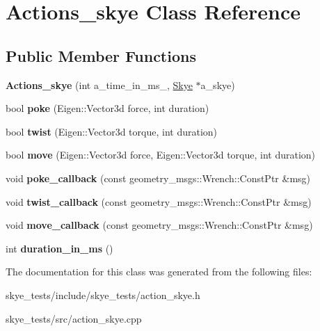 \hypertarget{class_actions__skye}{\section{Actions\-\_\-skye Class Reference}
\label{class_actions__skye}
}
\subsection*{Public Member Functions}
\begin{DoxyCompactItemize}
\item 
\hypertarget{class_actions__skye_aa039f0081ea0593477b08731d92bee1e}{{\bfseries Actions\-\_\-skye} (int a\-\_\-time\-\_\-in\-\_\-ms\-\_\-, \hyperlink{class_skye}{Skye} $\ast$a\-\_\-skye)}\label{class_actions__skye_aa039f0081ea0593477b08731d92bee1e}

\item 
\hypertarget{class_actions__skye_af5867f71704e52693007db4ab1845d24}{bool {\bfseries poke} (Eigen\-::\-Vector3d force, int duration)}\label{class_actions__skye_af5867f71704e52693007db4ab1845d24}

\item 
\hypertarget{class_actions__skye_a5aa98248ae4390991838fb5f40241033}{bool {\bfseries twist} (Eigen\-::\-Vector3d torque, int duration)}\label{class_actions__skye_a5aa98248ae4390991838fb5f40241033}

\item 
\hypertarget{class_actions__skye_a3b07fc6001859d70c766b7f0caa067ac}{bool {\bfseries move} (Eigen\-::\-Vector3d force, Eigen\-::\-Vector3d torque, int duration)}\label{class_actions__skye_a3b07fc6001859d70c766b7f0caa067ac}

\item 
\hypertarget{class_actions__skye_a8534c3ed16d40bda704a0ad9ab02036f}{void {\bfseries poke\-\_\-callback} (const geometry\-\_\-msgs\-::\-Wrench\-::\-Const\-Ptr \&msg)}\label{class_actions__skye_a8534c3ed16d40bda704a0ad9ab02036f}

\item 
\hypertarget{class_actions__skye_a66eb2349625a38723b253a84b6bd2c65}{void {\bfseries twist\-\_\-callback} (const geometry\-\_\-msgs\-::\-Wrench\-::\-Const\-Ptr \&msg)}\label{class_actions__skye_a66eb2349625a38723b253a84b6bd2c65}

\item 
\hypertarget{class_actions__skye_ac33f385c3ab1a4c3cabd2f56fc762429}{void {\bfseries move\-\_\-callback} (const geometry\-\_\-msgs\-::\-Wrench\-::\-Const\-Ptr \&msg)}\label{class_actions__skye_ac33f385c3ab1a4c3cabd2f56fc762429}

\item 
\hypertarget{class_actions__skye_a2dc9bd96450fb48addcbe14dd6b3f99e}{int {\bfseries duration\-\_\-in\-\_\-ms} ()}\label{class_actions__skye_a2dc9bd96450fb48addcbe14dd6b3f99e}

\end{DoxyCompactItemize}


The documentation for this class was generated from the following files\-:\begin{DoxyCompactItemize}
\item 
skye\-\_\-tests/include/skye\-\_\-tests/action\-\_\-skye.\-h\item 
skye\-\_\-tests/src/action\-\_\-skye.\-cpp\end{DoxyCompactItemize}
